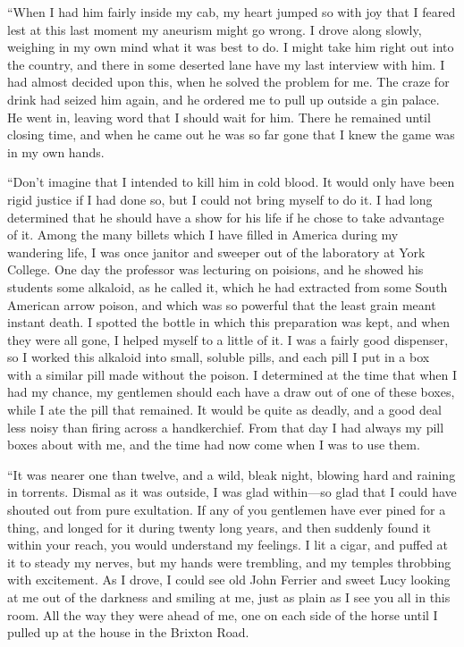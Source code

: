 \documentclass[12pt]{book}
\begin{document}
“When I had him fairly inside my cab, my heart jumped so with joy that I feared lest at this last moment my aneurism might go wrong. I drove along slowly, weighing in my own mind what it was best to do. I might take him right out into the country, and there in some deserted lane have my last interview with him. I had almost decided upon this, when he solved the problem for me. The craze for drink had seized him again, and he ordered me to pull up outside a gin palace. He went in, leaving word that I should wait for him. There he remained until closing time, and when he came out he was so far gone that I knew the game was in my own hands. 

“Don’t imagine that I intended to kill him in cold blood. It would only have been rigid justice if I had done so, but I could not bring myself to do it. I had long determined that he should have a show for his life if he chose to take advantage of it. Among the many billets which I have filled in America during my wandering life, I was once janitor and sweeper out of the laboratory at York College. One day the professor was lecturing on poisions, and he showed his students some alkaloid, as he called it, which he had extracted from some South American arrow poison, and which was so powerful that the least grain meant instant death. I spotted the bottle in which this preparation was kept, and when they were all gone, I helped myself to a little of it. I was a fairly good dispenser, so I worked this alkaloid into small, soluble pills, and each pill I put in a box with a similar pill made without the poison. I determined at the time that when I had my chance, my gentlemen should each have a draw out of one of these boxes, while I ate the pill that remained. It would be quite as deadly, and a good deal less noisy than firing across a handkerchief. From that day I had always my pill boxes about with me, and the time had now come when I was to use them. 

“It was nearer one than twelve, and a wild, bleak night, blowing hard and raining in torrents. Dismal as it was outside, I was glad within—so glad that I could have shouted out from pure exultation. If any of you gentlemen have ever pined for a thing, and longed for it during twenty long years, and then suddenly found it within your reach, you would understand my feelings. I lit a cigar, and puffed at it to steady my nerves, but my hands were trembling, and my temples throbbing with excitement. As I drove, I could see old John Ferrier and sweet Lucy looking at me out of the darkness and smiling at me, just as plain as I see you all in this room. All the way they were ahead of me, one on each side of the horse until I pulled up at the house in the Brixton Road. 
\end{document}
